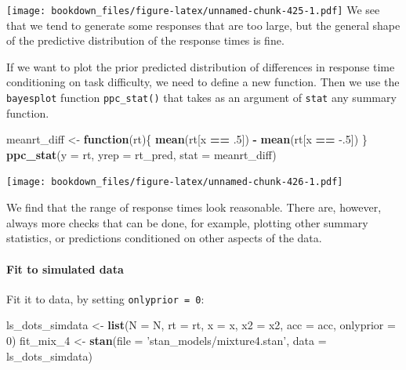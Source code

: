 \documentclass[12pt,]{krantz}
\newenvironment{Shaded}{\begin{snugshade}}{\end{snugshade}}
\newcommand{\KeywordTok}[1]{\textcolor[rgb]{0.13,0.29,0.53}{\textbf{#1}}}
\newcommand{\DataTypeTok}[1]{\textcolor[rgb]{0.13,0.29,0.53}{#1}}
\newcommand{\DecValTok}[1]{\textcolor[rgb]{0.00,0.00,0.81}{#1}}
\newcommand{\FloatTok}[1]{\textcolor[rgb]{0.00,0.00,0.81}{#1}}
\newcommand{\StringTok}[1]{\textcolor[rgb]{0.31,0.60,0.02}{#1}}
\newcommand{\ControlFlowTok}[1]{\textcolor[rgb]{0.13,0.29,0.53}{\textbf{#1}}}
\newcommand{\OperatorTok}[1]{\textcolor[rgb]{0.81,0.36,0.00}{\textbf{#1}}}
\newcommand{\NormalTok}[1]{#1}
\let\oldparagraph\paragraph
\renewcommand{\paragraph}[1]{\oldparagraph{#1}\mbox{}}
\theoremstyle{definition}
\theoremstyle{definition}
\theoremstyle{definition}
\theoremstyle{remark}
\begin{document}
\texttt{[image: bookdown\_files/figure-latex/unnamed-chunk-425-1.pdf]} We
see that we tend to generate some responses that are too large, but the
general shape of the predictive distribution of the response times is
fine.

If we want to plot the prior predicted distribution of differences in
response time conditioning on task difficulty, we need to define a new
function. Then we use the \texttt{bayesplot} function
\texttt{ppc\_stat()} that takes as an argument of \texttt{stat} any
summary function.

\begin{Shaded}
\begin{Highlighting}[]
\NormalTok{meanrt_diff <-}\StringTok{ }\ControlFlowTok{function}\NormalTok{(rt)\{}
  \KeywordTok{mean}\NormalTok{(rt[x }\OperatorTok{==}\StringTok{ }\FloatTok{.5}\NormalTok{]) }\OperatorTok{-}\StringTok{ }\KeywordTok{mean}\NormalTok{(rt[x }\OperatorTok{==}\StringTok{ }\FloatTok{-.5}\NormalTok{])}
\NormalTok{\}}
\KeywordTok{ppc_stat}\NormalTok{(}\DataTypeTok{y =}\NormalTok{ rt, }\DataTypeTok{yrep =}\NormalTok{ rt_pred, }\DataTypeTok{stat =}\NormalTok{ meanrt_diff) }
\end{Highlighting}
\end{Shaded}

\texttt{[image: bookdown\_files/figure-latex/unnamed-chunk-426-1.pdf]}

We find that the range of response times look reasonable. There are,
however, always more checks that can be done, for example, plotting
other summary statistics, or predictions conditioned on other aspects of
the data.

\paragraph{Fit to simulated data}\label{fit-to-simulated-data}

Fit it to data, by setting \texttt{onlyprior\ =\ 0}:

\begin{Shaded}
\begin{Highlighting}[]
\NormalTok{ls_dots_simdata <-}\StringTok{ }\KeywordTok{list}\NormalTok{(}\DataTypeTok{N =}\NormalTok{ N,}
                        \DataTypeTok{rt =}\NormalTok{ rt,}
                        \DataTypeTok{x =}\NormalTok{ x,}
                        \DataTypeTok{x2 =}\NormalTok{ x2,}
                        \DataTypeTok{acc =}\NormalTok{ acc,}
                        \DataTypeTok{onlyprior =} \DecValTok{0}\NormalTok{) }
\NormalTok{fit_mix_}\DecValTok{4}\NormalTok{ <-}\StringTok{ }\KeywordTok{stan}\NormalTok{(}\DataTypeTok{file =} \StringTok{'stan_models/mixture4.stan'}\NormalTok{,}
                  \DataTypeTok{data =}\NormalTok{ ls_dots_simdata) }
\end{Highlighting}
\end{Shaded}
\end{document}
